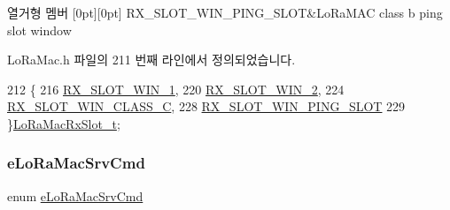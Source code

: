 \begin{DoxyEnumFields}{열거형 멤버}
[0pt][0pt]{}\mbox{\label{group___l_o_r_a_m_a_c_gga933a5a2f7d57b1a5cb22f061e30558fea44705442cff2bdf0f626de44d646f685}} 
R\+X\+\_\+\+S\+L\+O\+T\+\_\+\+W\+I\+N\+\_\+\+P\+I\+N\+G\+\_\+\+S\+L\+OT&Lo\+Ra\+M\+AC class b ping slot window \\
\hline

\end{DoxyEnumFields}


Lo\+Ra\+Mac.\+h 파일의 211 번째 라인에서 정의되었습니다.


\begin{DoxyCode}
212 \{
216     \mbox{\hyperlink{group___l_o_r_a_m_a_c_gga933a5a2f7d57b1a5cb22f061e30558fea5fa7051b96e31f50660867ec02cb6624}{RX\_SLOT\_WIN\_1}},
220     \mbox{\hyperlink{group___l_o_r_a_m_a_c_gga933a5a2f7d57b1a5cb22f061e30558feace540b9f9215441fc67199b013a4fab9}{RX\_SLOT\_WIN\_2}},
224     \mbox{\hyperlink{group___l_o_r_a_m_a_c_gga933a5a2f7d57b1a5cb22f061e30558fea8785f8319ec8d3476f892af54a9e28fc}{RX\_SLOT\_WIN\_CLASS\_C}},
228     \mbox{\hyperlink{group___l_o_r_a_m_a_c_gga933a5a2f7d57b1a5cb22f061e30558fea44705442cff2bdf0f626de44d646f685}{RX\_SLOT\_WIN\_PING\_SLOT}}
229 \}\mbox{\hyperlink{group___l_o_r_a_m_a_c_ga082bd3322087fa2f42c902a0b360ff4f}{LoRaMacRxSlot\_t}};
\end{DoxyCode}
\mbox{\label{group___l_o_r_a_m_a_c_gac91cc4dc69ad7de2426360f9f1f2d079}} 
\subsubsection{\texorpdfstring{e\+Lo\+Ra\+Mac\+Srv\+Cmd}{eLoRaMacSrvCmd}}
{\footnotesize\ttfamily enum \mbox{\hyperlink{group___l_o_r_a_m_a_c_gac91cc4dc69ad7de2426360f9f1f2d079}{e\+Lo\+Ra\+Mac\+Srv\+Cmd}}}

